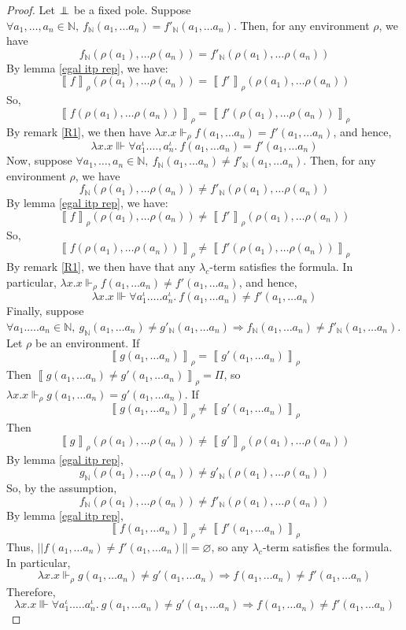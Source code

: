 \documentclass[a4paper,12pt]{article}
\theoremstyle{rmqstyle}
\newcommand{\N}{\mathbb{N}}
\newcommand{\abss}[1]{\lvert \lvert#1\rvert \rvert}
\newcommand{\itp}[1]{\left\llbracket#1\right\rrbracket}
\renewcommand{\implies}{\Rightarrow}
\newcommand{\pole}{{\protect\mathpalette{\protect\polehelper}{\bot}}} \def\polehelper#1#2{\mathrel{\rlap{$#1#2$}\mkern3mu{#1#2}}}
\begin{document}
\begin{proof}
Let $\pole$ be a fixed pole. Suppose $\forall a_1, \dots, a_n \in \N, \ f_\N(a_1, \dots a_n) = f'_\N (a_1, \dots a_n)$. Then, for any environment $\rho$, we have
$$f_\N(\rho(a_1), \dots \rho(a_n)) = f'_\N (\rho(a_1), \dots \rho(a_n))$$
By lemma \ref{egal itp rep}, we have:
$$ \itp{f}_\rho (\rho(a_1), \dots \rho(a_n)) = \itp{f'}_\rho (\rho(a_1), \dots \rho(a_n))$$
So,
$$ \itp{f(\rho(a_1), \dots \rho(a_n))}_\rho = \itp{f'(\rho(a_1), \dots \rho(a_n))}_\rho$$
By remark \ref{R1}, we then have $\lambda x.x \Vdash_\rho f(a_1, \dots a_n) = f'(a_1, \dots a_n)$, and hence,
$$\lambda x.x \Vvdash \forall a_1^\iota. \dots, a_n^\iota. \ f(a_1, \dots a_n) = f'(a_1, \dots a_n)$$
Now, suppose $\forall a_1, \dots, a_n \in \N, \ f_\N(a_1, \dots a_n) \neq f'_\N (a_1, \dots a_n)$. Then, for any environment $\rho$, we have
$$f_\N(\rho(a_1), \dots \rho(a_n)) \neq f'_\N (\rho(a_1), \dots \rho(a_n))$$
By lemma \ref{egal itp rep}, we have:
$$ \itp{f}_\rho (\rho(a_1), \dots \rho(a_n)) \neq \itp{f'}_\rho (\rho(a_1), \dots \rho(a_n))$$
So,
$$ \itp{f(\rho(a_1), \dots \rho(a_n))}_\rho \neq \itp{f'(\rho(a_1), \dots \rho(a_n))}_\rho$$
By remark \ref{R1}, we then have that any $\lambda_c$-term satisfies the formula. In particular, $\lambda x.x \Vdash_\rho f(a_1, \dots a_n) \neq f'(a_1, \dots a_n)$, and hence,
$$\lambda x.x \Vvdash \forall a_1^\iota. \dots. a_n^\iota. \ f(a_1, \dots a_n) \neq f'(a_1, \dots a_n)$$
Finally, suppose $\forall a_1. \dots. a_n \in \N, \ g_\N (a_1, \dots a_n) \neq g'_\N (a_1, \dots a_n) \implies f_\N(a_1, \dots a_n) \neq f'_\N (a_1, \dots a_n)$. Let $\rho$ be an environment. If
$$\itp{g(a_1, \dots a_n)}_\rho = \itp{g'(a_1, \dots a_n)}_\rho$$
Then $\itp{g(a_1, \dots a_n) \neq g'(a_1, \dots a_n)}_\rho = \Pi$, so $\lambda x.x \Vdash_\rho g(a_1, \dots a_n) = g'(a_1, \dots a_n)$. If
$$\itp{g(a_1, \dots a_n)}_\rho \neq \itp{g'(a_1, \dots a_n)}_\rho$$
Then
$$\itp{g}_\rho (\rho(a_1), \dots \rho(a_n)) \neq \itp{g'}_\rho (\rho(a_1), \dots \rho(a_n))$$ 
By lemma \ref{egal itp rep},
$$g_\N (\rho(a_1), \dots \rho(a_n)) \neq g'_\N (\rho(a_1), \dots \rho(a_n))$$
So, by the assumption,
$$f_\N (\rho(a_1), \dots \rho(a_n)) \neq f'_\N (\rho(a_1), \dots \rho(a_n))$$
By lemma \ref{egal itp rep},
$$\itp{f(a_1, \dots a_n)}_\rho \neq \itp{f'(a_1, \dots a_n)}_\rho$$
Thus, $\abss{f(a_1, \dots a_n) \neq f'(a_1, \dots a_n)} = \varnothing$, so any $\lambda_c$-term satisfies the formula. In particular,
$$\lambda x.x \Vdash_\rho g(a_1, \dots a_n) \neq g'(a_1, \dots a_n) \implies  f(a_1, \dots a_n) \neq f'(a_1, \dots a_n)$$
Therefore,
$$\lambda x.x \Vvdash \forall a_1^\iota. \dots. a_n^\iota. \ g(a_1, \dots a_n) \neq g'(a_1, \dots a_n) \implies  f(a_1, \dots a_n) \neq f'(a_1, \dots a_n)$$
\end{proof}
\end{document}
